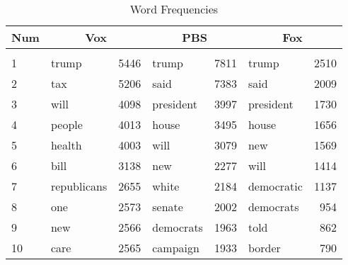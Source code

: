 \begin{table}[H]
    \centering
    \caption{Word Frequencies}
    \label{tab:1gram}
    \begin{tabular}{l|lr|lr|lr} \hline
    \textbf{Num} & \multicolumn{2}{c|}{\textbf{Vox}} & \multicolumn{2}{c|}{\textbf{PBS}} & \multicolumn{2}{c}{\textbf{Fox}} \\ \hline \hline
    &&&&&& \\
    1   & trump       & 5446 & trump     & 7811 & trump      & 2510 \\
    2   & tax         & 5206 & said      & 7383 & said       & 2009 \\
    3   & will        & 4098 & president & 3997 & president  & 1730 \\
    4   & people      & 4013 & house     & 3495 & house      & 1656 \\
    5   & health      & 4003 & will      & 3079 & new        & 1569 \\
    6   & bill        & 3138 & new       & 2277 & will       & 1414 \\
    7   & republicans & 2655 & white     & 2184 & democratic & 1137 \\
    8   & one         & 2573 & senate    & 2002 & democrats  & 954  \\
    9   & new         & 2566 & democrats & 1963 & told       & 862  \\
    10  & care        & 2565 & campaign  & 1933 & border     & 790 \\ \hline
    \end{tabular}
\end{table}
